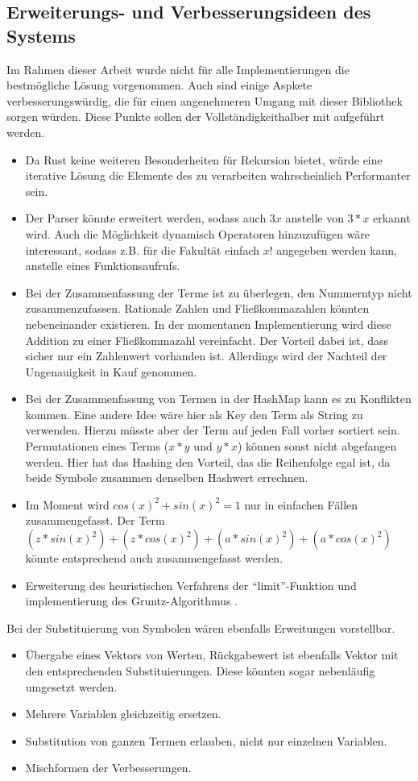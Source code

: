 \documentclass[11pt,a4paper, ngerman]{article}
\begin{document}
\subsection{Erweiterungs- und Verbesserungsideen des Systems}
Im Rahmen dieser Arbeit wurde nicht für alle Implementierungen die bestmögliche Lösung vorgenommen. Auch sind einige Aspkete verbesserungswürdig, die für einen angenehmeren Umgang mit dieser Bibliothek sorgen würden. Diese Punkte sollen der Vollständigkeithalber mit aufgeführt werden.
\begin{itemize}
    \item Da Rust keine weiteren Besonderheiten für Rekursion bietet, würde eine iterative Lösung die Elemente des  zu verarbeiten wahrscheinlich Performanter sein.
    \item Der Parser könnte erweitert werden, sodass auch $3x$ anstelle von $3*x$ erkannt wird. Auch die Möglichkeit dynamisch Operatoren hinzuzufügen wäre interessant, sodass z.B. für die Fakultät einfach $x!$ angegeben werden kann, anstelle eines Funktionsaufrufs.
    \item Bei der Zusammenfassung der Terme ist zu überlegen, den Nummerntyp nicht zusammenzufassen. Rationale Zahlen und Fließkommazahlen könnten nebeneinander existieren. In der momentanen Implementierung wird diese Addition zu einer Fließkommazahl vereinfacht. Der Vorteil dabei ist, dass sicher nur ein Zahlenwert vorhanden ist. Allerdings wird der Nachteil der Ungenauigkeit in Kauf genommen.
    \item Bei der Zusammenfassung von Termen in der HashMap kann es zu Konflikten kommen. Eine andere Idee wäre hier als Key den Term als String zu verwenden. Hierzu müsste aber der Term auf jeden Fall vorher sortiert sein. Permutationen eines Terms ($x*y$ und $y*x$) können sonst nicht abgefangen werden. Hier hat das Hashing den Vorteil, das die Reihenfolge egal ist, da beide Symbole zusammen denselben Hashwert errechnen.
    \item Im Moment wird $cos(x)^2+sin(x)^2 = 1$ nur in einfachen Fällen zusammengefasst. Der Term $(z*sin(x)^2)+(z*cos(x)^2) + (a*sin(x)^2)+(a*cos(x)^2)$ könnte entsprechend auch zusammengefasst werden.
    \item Erweiterung des heuristischen Verfahrens der ``limit''-Funktion und implementierung des Gruntz-Algorithmus \cite{GruntzPdf}.
\end{itemize}

Bei der Substituierung von Symbolen wären ebenfalls Erweitungen vorstellbar.
\begin{itemize}
    \item Übergabe eines Vektors von Werten, Rückgabewert ist ebenfalls Vektor mit den entsprechenden Substituierungen. Diese könnten sogar nebenläufig umgesetzt werden.
    \item Mehrere Variablen gleichzeitig ersetzen.
    \item Substitution von ganzen Termen erlauben, nicht nur einzelnen Variablen.
    \item Mischformen der Verbesserungen.
\end{itemize}
\end{document}
